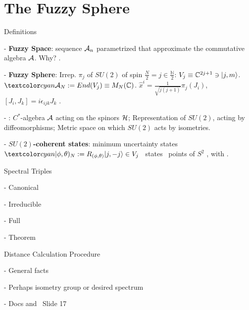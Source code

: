 \section{The Fuzzy Sphere}

\begin{frame}{Definitions} %
    
    - \textbf{Fuzzy Space}: %
    sequence $\mathcal A_n$ parametrized that approximate the commutative algebra $\mathcal A$. Why? .
    
    - \textbf{Fuzzy Sphere}: Irrep. $\pi_j$ of $SU(2)$ of spin $\frac{N}{2} = j \in \frac{\mathbb N}{2}$: $V_j \equiv \mathbb C^{2j+1} \ni |j, m\rangle$. $\lbtext{\acal_N}:= End(V_j) \equiv M_N(\CC)$. $\hat x^i = \frac{1}{\sqrt{j(j+1)}} \pi_{j}(J_i)$, $[J_i, J_k] = i \epsilon_{ijk} J_k$ \then {}.
    
    - :  $C^*$-algebra $\mathcal A$ acting on the spinors $\mathcal H$;  Representation of $SU(2)$, acting by diffeomorphisms;   Metric space on which $SU(2)$ acts by isometries.
    
    - \textbf{$SU(2)$-coherent states}: minimum uncertainty states $\lbtext{|\phi, \theta)_N} := R_{(\phi, \theta)}|j, -j\rangle \in V_j$ \iff\ states  \iff\ points of $S^2$ , with .
    
\end{frame}


\begin{frame}{Spectral Triples} %
    
     - Canonical
     
     - Irreducible
     
     - Full
     
     - Theorem
    
\end{frame}


\begin{frame}{Distance Calculation Procedure} %
    
     - General facts
     
     - Perhaps isometry group or desired spectrum
     
     - Docs and ~Slide 17
    
\end{frame}